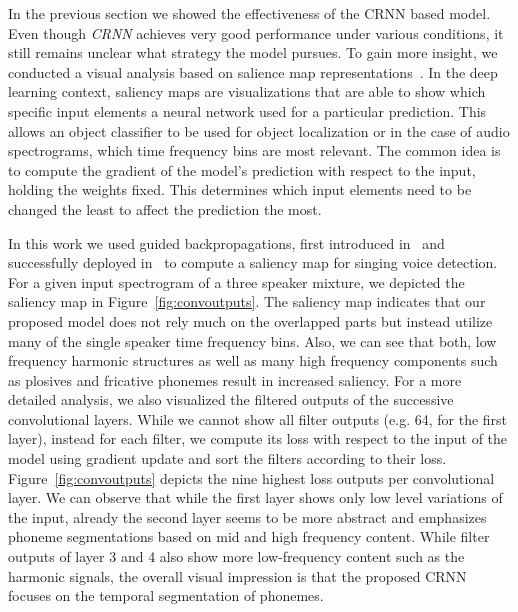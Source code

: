 In the previous section we showed the effectiveness of the CRNN based model.
Even though \emph{CRNN} achieves very good performance under various conditions, it still remains unclear what strategy the model pursues.
To gain more insight, we conducted a visual analysis based on salience map representations~\cite{Simonyan13}.
In the deep learning context, saliency maps are visualizations that are able to show which specific input elements a neural network used for a particular prediction. This allows an object classifier to be used for object localization or in the case of audio spectrograms, which time frequency bins are most relevant.
The common idea is to compute the gradient of the model's prediction with respect to the input, holding the weights fixed. This determines which input elements need to be changed the least to affect the prediction the most.
\par
In this work we used guided backpropagations, first introduced in~\cite{Springenberg14} and successfully deployed in~\cite{schluter16} to compute a saliency map for singing voice detection.
For a given input spectrogram of a three speaker mixture, we depicted the saliency map in Figure~\ref{fig:convoutputs}.
The saliency map indicates that our proposed model does not rely much on the overlapped parts but instead utilize many of the single speaker time frequency bins.
Also, we can see that both, low frequency harmonic structures as well as many high frequency components such as plosives and fricative phonemes result in increased saliency.
For a more detailed analysis, we also visualized the filtered outputs of the successive convolutional layers.
While we cannot show all filter outputs (e.g. 64, for the first layer), instead for each filter, we compute its loss with respect to the input of the model using gradient update and sort the filters according to their loss.
Figure~\ref{fig:convoutputs} depicts the nine highest loss outputs per convolutional layer.
We can observe that while the first layer shows only low level variations of the input, already the second layer seems to be more abstract and emphasizes phoneme segmentations based on mid and high frequency content.
While filter outputs of layer 3 and 4 also show more low-frequency content such as the harmonic signals, the overall visual impression is that the proposed CRNN focuses on the temporal segmentation of phonemes.
